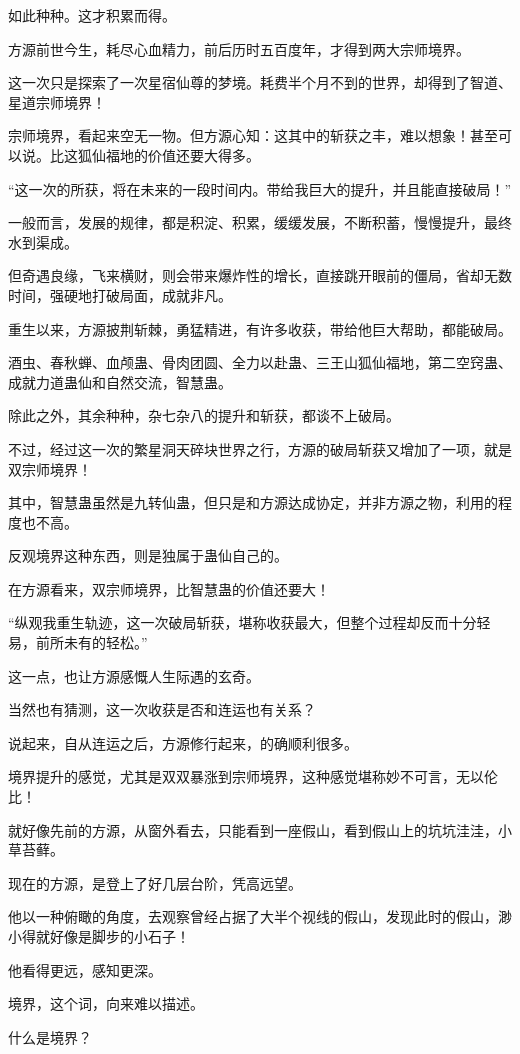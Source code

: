 \begin{this_body}
如此种种。这才积累而得。

方源前世今生，耗尽心血精力，前后历时五百度年，才得到两大宗师境界。

这一次只是探索了一次星宿仙尊的梦境。耗费半个月不到的世界，却得到了智道、星道宗师境界！

宗师境界，看起来空无一物。但方源心知：这其中的斩获之丰，难以想象！甚至可以说。比这狐仙福地的价值还要大得多。

“这一次的所获，将在未来的一段时间内。带给我巨大的提升，并且能直接破局！”

一般而言，发展的规律，都是积淀、积累，缓缓发展，不断积蓄，慢慢提升，最终水到渠成。

但奇遇良缘，飞来横财，则会带来爆炸性的增长，直接跳开眼前的僵局，省却无数时间，强硬地打破局面，成就非凡。

重生以来，方源披荆斩棘，勇猛精进，有许多收获，带给他巨大帮助，都能破局。

酒虫、春秋蝉、血颅蛊、骨肉团圆、全力以赴蛊、三王山狐仙福地，第二空窍蛊、成就力道蛊仙和自然交流，智慧蛊。

除此之外，其余种种，杂七杂八的提升和斩获，都谈不上破局。

不过，经过这一次的繁星洞天碎块世界之行，方源的破局斩获又增加了一项，就是双宗师境界！

其中，智慧蛊虽然是九转仙蛊，但只是和方源达成协定，并非方源之物，利用的程度也不高。

反观境界这种东西，则是独属于蛊仙自己的。

在方源看来，双宗师境界，比智慧蛊的价值还要大！

“纵观我重生轨迹，这一次破局斩获，堪称收获最大，但整个过程却反而十分轻易，前所未有的轻松。”

这一点，也让方源感慨人生际遇的玄奇。

当然也有猜测，这一次收获是否和连运也有关系？

说起来，自从连运之后，方源修行起来，的确顺利很多。

境界提升的感觉，尤其是双双暴涨到宗师境界，这种感觉堪称妙不可言，无以伦比！

就好像先前的方源，从窗外看去，只能看到一座假山，看到假山上的坑坑洼洼，小草苔藓。

现在的方源，是登上了好几层台阶，凭高远望。

他以一种俯瞰的角度，去观察曾经占据了大半个视线的假山，发现此时的假山，渺小得就好像是脚步的小石子！

他看得更远，感知更深。

境界，这个词，向来难以描述。

什么是境界？


\end{this_body}
